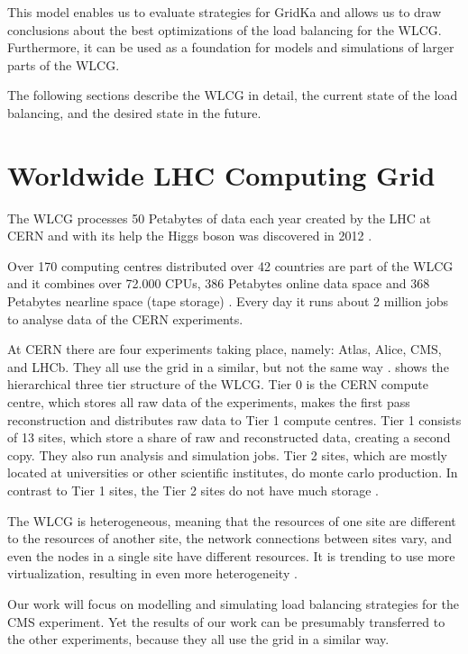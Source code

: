 This model enables us to evaluate strategies for GridKa and allows us to draw conclusions about the best optimizations of the load balancing for the WLCG. Furthermore, it can be used as a foundation for models and simulations of larger parts of the WLCG.


The following sections describe the WLCG in detail, the current state of the load balancing, and the desired state in the future.

\section{Worldwide LHC Computing Grid}

The WLCG processes 50 Petabytes of data each year created by the LHC at CERN \cite{data_process}
and with its help the Higgs boson was discovered in 2012 \cite{wlcg_online}.

Over 170 computing centres distributed over 42 countries are part of the WLCG and it combines over 72.000 CPUs, 386 Petabytes online data space and 368 Petabytes nearline space (tape storage) \cite{wlcg_data}. Every day it runs about 2 million jobs to analyse data of the CERN experiments.

At CERN there are four experiments taking place, namely: Atlas, Alice, CMS, and LHCb. They all use the grid in a similar, but not the same way \cite{wlcg_computing}.  shows the hierarchical three tier structure of the WLCG. Tier 0 is the CERN compute centre, which stores all raw data of the experiments, makes the first pass reconstruction and distributes raw data to Tier 1 compute centres. Tier 1 consists of 13 sites, which store a share of raw and reconstructed data, creating a second copy. They also run analysis and simulation jobs. Tier 2 sites, which are mostly located at universities or other scientific institutes, do monte carlo production. In contrast to Tier 1 sites, the Tier 2 sites do not have much storage \cite{wlcg_computing}.

The WLCG is heterogeneous, meaning that the resources of one site are different to the resources of another site, the network connections between sites vary, and even the nodes in a single site have different resources. It is trending to use more virtualization, resulting in even more heterogeneity \cite{wlcg_update}.

Our work will focus on modelling and simulating load balancing strategies for the CMS experiment. Yet the results of our work can be presumably transferred to the other experiments, because they all use the grid in a similar way.

